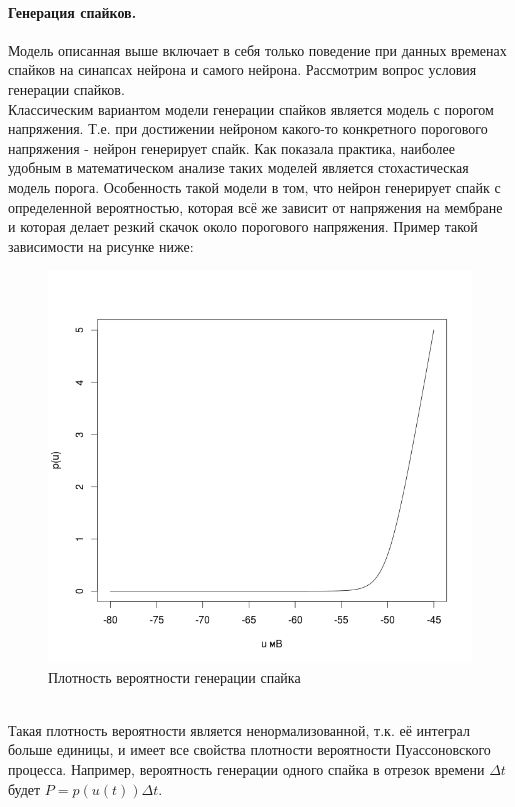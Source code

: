 \documentclass[a4paper,10pt]{article}
\begin{document}
\paragraph*{Генерация спайков.} Модель описанная выше включает в себя только поведение при данных временах спайков на синапсах нейрона и самого нейрона. Рассмотрим вопрос условия генерации спайков.\\
\indent Классическим вариантом модели генерации спайков является модель с порогом напряжения. Т.е. при достижении нейроном какого-то конкретного порогового напряжения - нейрон генерирует спайк. Как показала практика, наиболее удобным в математическом анализе таких моделей является стохастическая модель порога. Особенность такой модели в том, что нейрон генерирует спайк с определенной вероятностью, которая всё же зависит от напряжения на мембране и которая делает резкий скачок около порогового напряжения. Пример такой зависимости на рисунке ниже:
\begin{figure}[ht]\label{pic:p_srm}
\centering
\includegraphics[width=1\linewidth]{p_srm}
\caption{Плотность вероятности генерации спайка}
\end{figure} \\
\indent Такая плотность вероятности является ненормализованной, т.к. её интеграл больше единицы, и имеет все свойства плотности вероятности Пуассоновского процесса. Например, вероятность генерации одного спайка в отрезок времени $\Delta t$ будет $P = p(u(t))\Delta t$.
\end{document}
